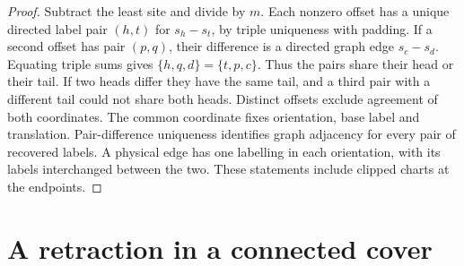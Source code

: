 \documentclass[11pt,letterpaper]{article}
\numberwithin{equation}{section}
\begin{document}
\begin{proof}

Subtract the least site and divide by \(m\). Each nonzero offset has a unique directed label
pair \((h,t)\) for \(s_h-s_t\), by triple uniqueness with padding. If a second offset has pair
\((p,q)\), their difference is a directed graph edge \(s_c-s_d\). Equating triple sums gives
\(\{h,q,d\}=\{t,p,c\}\). Thus the pairs share their head or their tail. If two heads differ
they have the same tail, and a third pair with a different tail could not share both heads.
Distinct offsets exclude agreement of both coordinates. The common coordinate fixes
orientation, base label and translation. Pair-difference uniqueness identifies graph adjacency
for every pair of recovered labels. A physical edge has one labelling in each orientation,
with its labels interchanged between the two. These statements include clipped charts at the
endpoints.
\end{proof}

\section{A retraction in a connected cover}\label{sec:cover}
\end{document}
